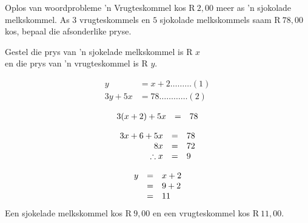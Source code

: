 \begin{wex}
{Oplos van woordprobleme}
{
’n
Vrugteskommel kos R$~2,00$ meer as ’n sjokolade melkskommel. As $3$ vrugteskommels en $5$ sjokolade melkskommels saam  R$~78,00$ kos,
bepaal die afsonderlike pryse.}

{
Gestel die prys van ’n sjokelade melkskommel is R $x$ 
\\en die prys van ’n vrugteskommel is  R $y$.


\begin{align*}
  y &= x+2  \ldots \ldots \ldots (1)\\
  3y+5x &= 78 \ldots \ldots \ldots \ldots (2)
\end{align*}

\begin{equation*}
\begin{array}{ccl}\hfill 3(x+2)+5x& =& 78\hfill \\
\end{array}
\end{equation*}

\begin{equation*}
\begin{array}{ccl}
 \hfill 3x+6+5x& =& 78\hfill \\ 
\hfill 8x& =& 72\hfill \\ 
\hfill \therefore x& =& 9\hfill \\  \end{array}
\end{equation*}

\begin{equation*}
\begin{array}{ccl}
\hfill y& =& x+2\hfill \\
 \hfill & =& 9+2\hfill \\ 
\hfill &  =& 11\hfill  \end{array}
\end{equation*}
Een sjokelade melkskommel kos R$~9,00$ en een vrugteskommel
kos R$~ 11,00$.
}
\end{wex}
\clearpage
